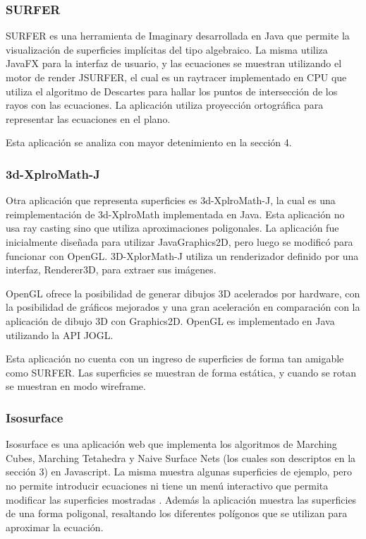 \documentclass[12pt]{article}
\begin{document}
\subsubsection{SURFER}
\noindent SURFER es una herramienta de Imaginary desarrollada en Java que permite la visualización de superficies implícitas del tipo algebraico. La misma utiliza JavaFX para la interfaz de usuario, y las ecuaciones se muestran utilizando el motor de render JSURFER, el cual es un raytracer implementado en CPU que utiliza el algoritmo de Descartes para hallar los puntos de intersección de los rayos con las ecuaciones. La aplicación utiliza proyección ortográfica para representar las ecuaciones en el plano.

Esta aplicación se analiza con mayor detenimiento en la sección 4.
\subsubsection{3d-XplroMath-J}
\noindent Otra aplicación que representa superficies es 3d-XplroMath-J, la cual es una reimplementación de 3d-XplroMath implementada en Java. Esta aplicación no usa ray casting sino que utiliza aproximaciones poligonales. La aplicación fue inicialmente diseñada para utilizar JavaGraphics2D, pero luego se modificó para funcionar con OpenGL. 3D-XplorMath-J utiliza un  renderizador definido por una interfaz, Renderer3D, para extraer sus imágenes. 

OpenGL ofrece la posibilidad de generar dibujos 3D acelerados por hardware, con la posibilidad de gráficos mejorados y una gran aceleración en comparación con la aplicación de dibujo 3D con Graphics2D. OpenGL es implementado en Java utilizando la API JOGL.

Esta aplicación no cuenta con un ingreso de superficies de forma tan amigable como SURFER. Las superficies se muestran de forma estática, y cuando se rotan se muestran en modo wireframe.
\subsubsection{Isosurface}
\noindent Isosurface es una aplicación web que implementa los algoritmos de Marching Cubes, Marching Tetahedra y Naive Surface Nets (los cuales son descriptos en la sección 3) en Javascript. La misma muestra algunas superficies de ejemplo, pero no permite introducir ecuaciones ni tiene un menú interactivo que permita modificar las superficies mostradas . Además la aplicación muestra las superficies de una forma poligonal, resaltando los diferentes polígonos que se utilizan para aproximar la ecuación.  
\end{document}
